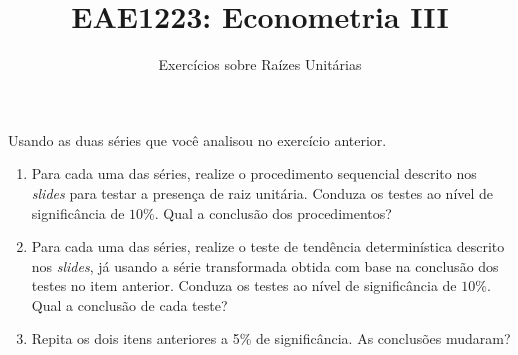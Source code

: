 \documentclass[10pt,a4paper]{article}
\title{\large EAE1223: Econometria III}
\author{\normalsize Exercícios sobre Raízes Unitárias}
\date{}
\begin{document}
	\maketitle
	Usando as duas séries que você analisou no exercício anterior.
\begin{enumerate}
	\item Para cada uma das séries, realize o procedimento sequencial descrito nos \textit{slides} para testar a presença de raiz unitária. Conduza os testes ao nível de significância de $10\%$. Qual a conclusão dos procedimentos?
	\item Para cada uma das séries, realize o teste de tendência determinística descrito nos \textit{slides}, já usando a série transformada obtida com base na conclusão dos testes no item anterior. Conduza os testes ao nível de significância de $10\%$.  Qual a conclusão de cada teste?
	
	\item Repita os dois itens anteriores a 5\% de significância. As conclusões mudaram?
\end{enumerate}
			
\end{document}
